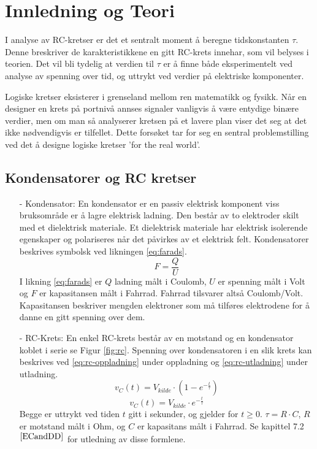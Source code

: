 \section{Innledning og Teori}

    I analyse av RC-kretser er det et sentralt moment å beregne tidskonstanten $\tau$.
    Denne breskriver de karakteristikkene en gitt RC-krets innehar, som vil belyses i teorien.
    Det vil bli tydelig at verdien til $\tau$ er å finne både eksperimentelt ved analyse av spenning over tid, og uttrykt ved verdier på elektriske komponenter.

    Logiske kretser eksisterer i grenseland mellom ren matematikk og fysikk.
    Når en designer en krets på portnivå annses signaler vanligvis å være entydige binære verdier, men om man så analyserer kretsen på et lavere plan viser det seg at det ikke nødvendigvis er tilfellet.
    Dette forsøket tar for seg en sentral problemstilling ved det å designe logiske kretser 'for the real world'.
\subsection{Kondensatorer og RC kretser}

    \begin{itemize}
        \item[-] Kondensator: En kondensator er en passiv elektrisk komponent viss bruksområde er å lagre elektrisk ladning.
        Den består av to elektroder skilt med et dielektrisk materiale.
        Et dielektrisk materiale har elektrisk isolerende egenskaper og polariseres når det påvirkes av et elektrisk felt.
        Kondensatorer beskrives symbolsk ved likningen \ref{eq:farads}.
        \begin{equation}
            F = \frac{Q}{U}
            \label{eq:farads}
        \end{equation}
        I likning \ref{eq:farads} er $Q$ ladning målt i Coulomb, $U$ er spenning målt i Volt og $F$ er kapasitansen målt i Fahrrad.
        Fahrrad tilsvarer altså Coulomb/Volt.
        Kapasitansen beskriver mengden elektroner som må tilføres elektrodene for å danne en gitt spenning over dem.
        \item[-] RC-Krets: En enkel RC-krets består av en motstand og en kondensator koblet i serie se Figur \ref{fig:rc}.
        Spenning over kondensatoren i en slik krets kan beskrives ved \ref{eq:rc-oppladning} under oppladning og \ref{eq:rc-utladning} under utladning.
        \begin{equation}
            v_{C}(t) = V_{kilde} \cdot \left( 1 - e^{-\frac{t}{\tau}} \right)
            \label{eq:rc-oppladning}
        \end{equation}
        \begin{equation}
            v_{C}(t) = V_{kilde} \cdot e^{-\frac{t}{\tau}}
            \label{eq:rc-utladning}
        \end{equation}
        Begge er uttrykt ved tiden $t$ gitt i sekunder, og gjelder for $t \geq 0$.
        $\tau = R \cdot C$, $R$ er motstand målt i Ohm, og $C$ er kapasitans målt i Fahrrad.
        Se kapittel 7.2$^{\ref{ECandDD}}$ for utledning av disse formlene.
    \end{itemize}

